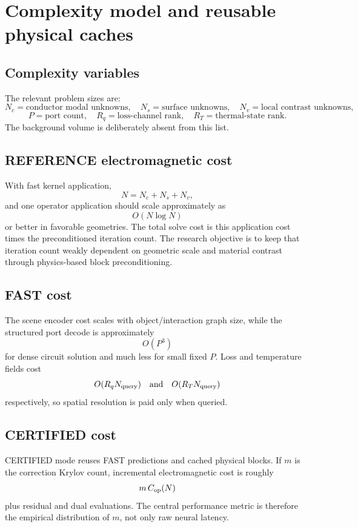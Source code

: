 \section{Complexity model and reusable physical caches}

\subsection{Complexity variables}

The relevant problem sizes are:
\[
 N_c=\text{conductor modal unknowns},\quad
 N_s=\text{surface unknowns},\quad
 N_v=\text{local contrast unknowns},
\]
\[
 P=\text{port count},\quad
 R_q=\text{loss-channel rank},\quad
 R_T=\text{thermal-state rank}.
\]
The background volume is deliberately absent from this list.

\subsection{REFERENCE electromagnetic cost}

With fast kernel application,
\[
 N=N_c+N_s+N_v,
\]
and one operator application should scale approximately as
\[
 O(N\log N)
\]
or better in favorable geometries. The total solve cost is this application
cost times the preconditioned iteration count. The research objective is to
keep that iteration count weakly dependent on geometric scale and material
contrast through physics-based block preconditioning.

\subsection{FAST cost}

The scene encoder cost scales with object/interaction graph size, while the
structured port decode is approximately
\[
 O(P^3)
\]
for dense circuit solution and much less for small fixed $P$. Loss and
temperature fields cost
\[
 O(R_q N_{\rm query})
 \quad\text{and}\quad
 O(R_T N_{\rm query})
\]
respectively, so spatial resolution is paid only when queried.

\subsection{CERTIFIED cost}

CERTIFIED mode reuses FAST predictions and cached physical blocks. If $m$ is
the correction Krylov count, incremental electromagnetic cost is roughly
\[
 m\,C_{\rm op}(N)
\]
plus residual and dual evaluations. The central performance metric is therefore
the empirical distribution of $m$, not only raw neural latency.

